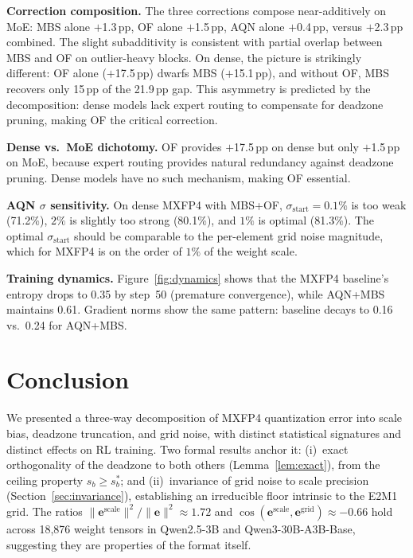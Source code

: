 \documentclass{article}
\theoremstyle{definition}
\theoremstyle{remark}
\begin{document}
 \textbf{Correction composition.}
  The three corrections compose near-additively on MoE: MBS alone
  $+$1.3\,pp, OF alone $+$1.5\,pp, AQN alone $+$0.4\,pp, versus
  $+$2.3\,pp combined. The slight subadditivity is consistent with
  partial overlap between MBS and OF on outlier-heavy blocks. On dense, the picture is strikingly
  different: OF alone ($+$17.5\,pp) dwarfs MBS ($+$15.1\,pp), and
  without OF, MBS recovers only 15\,pp of the 21.9\,pp gap.
  This asymmetry is predicted by the decomposition: dense models
  lack expert routing to compensate for deadzone pruning, making
  OF the critical correction.

\textbf{Dense vs.\ MoE dichotomy.}
OF provides $+$17.5\,pp on dense but only $+$1.5\,pp on MoE, because expert routing provides natural redundancy against deadzone pruning. Dense models have no such mechanism, making OF essential.

\textbf{AQN $\sigma$ sensitivity.}
On dense MXFP4 with MBS+OF, $\sigma_{\mathrm{start}} = 0.1\%$ is too weak (71.2\%), $2\%$ is slightly too strong (80.1\%), and $1\%$ is optimal (81.3\%). The optimal $\sigma_{\mathrm{start}}$ should be comparable to the per-element grid noise magnitude, which for MXFP4 is on the order of $1\%$ of the weight scale.



\textbf{Training dynamics.} \label{sec:dynamics}
Figure~\ref{fig:dynamics} shows that the MXFP4 baseline's entropy drops to 0.35 by step~50 (premature convergence), while AQN+MBS maintains 0.61. Gradient norms show the same pattern: baseline decays to 0.16 vs.\ 0.24 for AQN+MBS.

\section{Conclusion}
\label{sec:conclusion}
We presented a three-way decomposition of MXFP4 quantization error into scale bias, deadzone truncation, and grid noise, with distinct statistical signatures and distinct effects on RL training. Two formal results anchor it: (i)~exact orthogonality of the deadzone to both others (Lemma~\ref{lem:exact}), from the ceiling property $s_b \geq s_b^*$; and (ii)~invariance of grid noise to scale precision (Section~\ref{sec:invariance}), establishing an irreducible floor intrinsic to the E2M1 grid. The ratios $\|\mathbf{e}^{\mathrm{scale}}\|^2/\|\mathbf{e}\|^2 \approx 1.72$ and $\cos(\mathbf{e}^{\mathrm{scale}}, \mathbf{e}^{\mathrm{grid}}) \approx -0.66$ hold across 18,876 weight tensors in Qwen2.5-3B and Qwen3-30B-A3B-Base, suggesting they are properties of the format itself.
\end{document}
